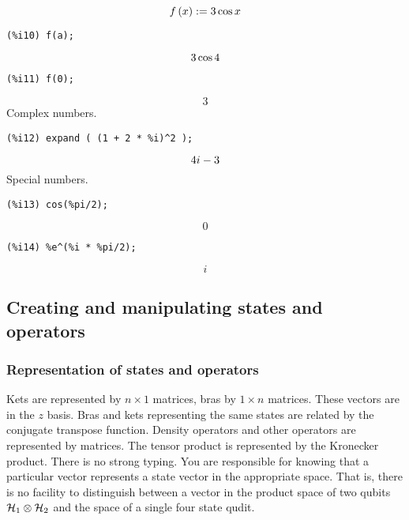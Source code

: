\documentclass[leqno]{article}
\begin{document}
\begin{dmath}[number={\%o9}]
 f\left(x\right):=3\*\cos x\end{dmath}
\begin{verbatim}
(%i10) f(a);
\end{verbatim}
\begin{dmath}[number={\%o10}]
 3\*\cos 4\end{dmath}
\begin{verbatim}
(%i11) f(0);
\end{verbatim}
\begin{dmath}[number={\%o11}]
 3\end{dmath}
Complex numbers.
\begin{verbatim}
(%i12) expand ( (1 + 2 * %i)^2 );
\end{verbatim}
\begin{dmath}[number={\%o12}]
 4\*i-3\end{dmath}
Special numbers.
\begin{verbatim}
(%i13) cos(%pi/2);
\end{verbatim}
\begin{dmath}[number={\%o13}]
 0\end{dmath}
\begin{verbatim}
(%i14) %e^(%i * %pi/2);
\end{verbatim}
\begin{dmath}[number={\%o14}]
 i\end{dmath}

\subsection{Creating and manipulating states and operators}

\subsubsection{Representation of states and operators}
Kets are represented by $n \times 1$ matrices, bras by $1
\times n$ matrices. These vectors are in the $z$ basis.
Bras and kets representing the same
states are related by the conjugate transpose function.
Density operators and other operators are represented by
matrices. The tensor product is represented by the Kronecker
product. There is no strong typing. You are responsible
for knowing that a particular vector represents a state vector
in the appropriate space. That is, there is no facility to 
distinguish between a vector in the product space of 
two qubits ${\cal H}_1 \otimes {\cal H}_2 $ and the space of
a single four state qudit.
\end{document}
